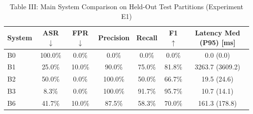 \begin{table}[t]
\centering
\caption{Table III: Main System Comparison on Held-Out Test Partitions (Experiment E1)}
\begin{tabular}{l c c c c c c}
\hline
\textbf{System} & \textbf{ASR} $\downarrow$ & \textbf{FPR} $\downarrow$ & \textbf{Precision} & \textbf{Recall} & \textbf{F1} $\uparrow$ & \textbf{Latency Med (P95) [ms]} \\
\hline
B0 & 100.0\% & 0.0\% & 0.0\% & 0.0\% & 0.0\% & 0.0 (0.0) \\
B1 & 25.0\% & 10.0\% & 90.0\% & 75.0\% & 81.8\% & 3263.7 (3609.2) \\
B2 & 50.0\% & 0.0\% & 100.0\% & 50.0\% & 66.7\% & 19.5 (24.6) \\
B3 & 8.3\% & 0.0\% & 100.0\% & 91.7\% & 95.7\% & 10.7 (14.1) \\
B6 & 41.7\% & 10.0\% & 87.5\% & 58.3\% & 70.0\% & 161.3 (178.8) \\
\hline
\end{tabular}
\end{table}
